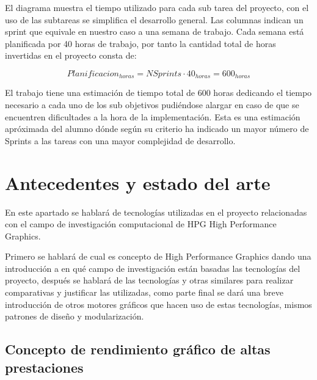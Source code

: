 \documentclass[a4paper, 17pt]{book}
\begin{document}
El diagrama muestra el tiempo utilizado para cada sub tarea del proyecto, con el uso de las subtareas se simplifica el 
desarrollo general. Las columnas indican un sprint que equivale en nuestro caso a una semana de trabajo. Cada semana
está planificada por 40 horas de trabajo, por tanto la cantidad total de horas invertidas en el proyecto consta de:

\begin{equation} Planificacion_{horas} = NSprints \cdot 40_{horas} = 600_{horas} \end{equation}

El trabajo tiene una estimación de tiempo total de 600 horas dedicando el tiempo necesario a cada uno de los sub
objetivos pudiéndose alargar en caso de que se encuentren dificultades a la hora de la implementación. Esta es una
estimación apróximada del alumno dónde según su criterio ha indicado un mayor número de Sprints
a las tareas con una mayor complejidad de desarrollo.


\cleardoublepage
\chapter{Antecedentes y estado del arte}

En este apartado se hablará de tecnologías utilizadas en el proyecto relacionadas con el campo de investigación
computacional de HPG High Performance Graphics. 

\vspace{1mm} %

Primero se hablará de cual es concepto de High Performance Graphics dando una introducción a en qué
campo de investigación están basadas las tecnologías del proyecto, después se hablará de las tecnologías
y otras similares para realizar comparativas y justificar las utilizadas, como parte final se dará una
breve introducción de otros motores gráficos que hacen uso de estas tecnologías, mismos patrones de diseño y modularización.

\section{Concepto de rendimiento gráfico de altas prestaciones} 
\label{sec:HPG}
\end{document}
